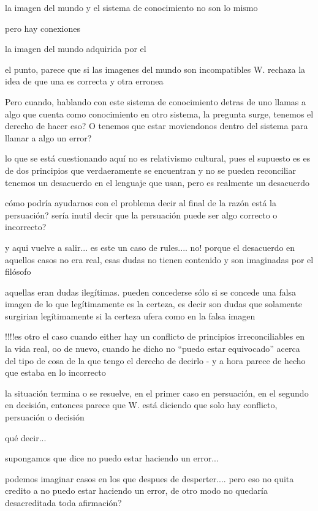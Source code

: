 la imagen del mundo y el sistema de conocimiento no son lo mismo

pero hay conexiones

  la imagen del mundo adquirida por el

el punto, parece que si las imagenes del mundo son incompatibles W. rechaza la idea de que una es correcta y otra erronea

Pero cuando, hablando con este sistema de conocimiento detras de uno llamas a algo que cuenta como conocimiento en otro sistema, la pregunta surge, tenemos el derecho de hacer eso? O tenemos que estar moviendonos dentro del sistema para llamar a algo un error?

lo que se está cuestionando aquí no es relativismo cultural, pues el supuesto es es de dos principios que verdaeramente se encuentran y no se pueden reconciliar tenemos un desacuerdo en el lenguaje que usan, pero es realmente un desacuerdo

cómo podría ayudarnos con el problema decir al final de la razón está la persuación? sería inutil decir que la persuación puede ser algo correcto o incorrecto?

  y aqui vuelve a salir... es este un caso de rules....
  no! porque el desacuerdo en aquellos casos no era real, esas dudas no tienen contenido y son imaginadas por el filósofo

  aquellas eran dudas ilegítimas. pueden concederse sólo si se concede una falsa imagen de lo que legítimamente es la certeza, es decir son dudas que solamente surgirian legítimamente si la certeza ufera como en la falsa imagen


  !!!!es otro el caso cuando either
  hay un conflicto de principios irreconciliables en la vida real,
  oo
  de nuevo, cuando he dicho no ``puedo estar equivocado'' acerca del tipo de cosa de la que tengo el derecho de decirlo - y a hora parece de hecho que estaba en lo incorrecto

  la situación termina o se resuelve, en el primer caso en persuación, en el segundo en decisión, entonces parece que W. está diciendo que solo hay conflicto, persuación o decisión

  qué decir...

  supongamos que dice no puedo estar haciendo un error...

  podemos imaginar casos en los que despues de desperter.... pero eso no quita credito a no puedo estar haciendo un error, de otro modo no quedaría desacreditada toda afirmación?

